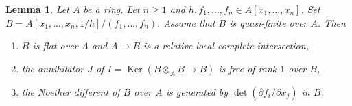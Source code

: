 \documentclass[10pt,a4paper]{amsart}
\theoremstyle{plain}
\newtheorem{lemma}[subsection]{Lemma}
\theoremstyle{definition}
\theoremstyle{remark}
\numberwithin{equation}{subsection}
\def\Ker{\mathop{\mathrm{Ker}}}
\begin{document}
\begin{lemma}
\label{lemma-quasi-finite-complete-intersection}
Let $A$ be a ring. Let $n \geq 1$ and
$h, f_1, \ldots, f_n \in A[x_1, \ldots, x_n]$.
Set $B = A[x_1, \ldots, x_n, 1/h]/(f_1, \ldots, f_n)$.
Assume that $B$ is quasi-finite over $A$.
Then
\begin{enumerate}
\item $B$ is flat over $A$ and $A \to B$ is a relative local complete
intersection,
\item the annihilator $J$ of $I = \Ker(B \otimes_A B \to B)$
is free of rank $1$ over $B$,
\item the Noether different of $B$ over $A$ is generated
by $\det(\partial f_i/\partial x_j)$ in $B$.
\end{enumerate}
\end{lemma}
\end{document}
